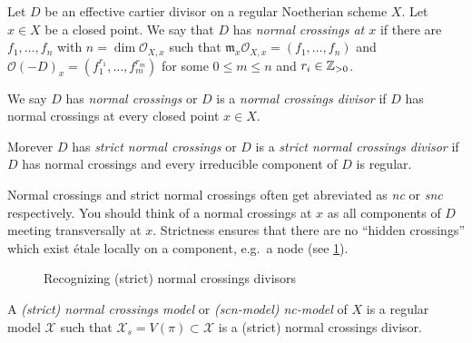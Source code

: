 \begin{definition}
	Let $D$ be an effective cartier divisor on a regular Noetherian scheme $X$. 	Let $x \in X$ be a closed point. 
	We say that $D$ has \emph{normal crossings at $x$ } if there are $f_1, \ldots, f_n$ with $n = \dim \mathcal{O}_{X, x}$ such that $\mathfrak{m} _x \mathcal{O}_{X, x} = (f_1, \ldots, f_n)$ and $\mathcal{O}(-D)_{x} = (f_1^{r_1}, \ldots, f_m^{r_m})$ for some $0 \le m \le n$ and $r_i \in \mathbb{Z}_{> 0}$. 

	We say $D$ has \emph{normal crossings} or $D$ is a \emph{normal crossings divisor} if $D$ has normal crossings at every closed point  $x \in X$. 

	Morever  $D$ has \emph{strict normal crossings} or $D$ is a \emph{strict normal crossings divisor} if $D$ has normal crossings and every irreducible component of $D$ is regular. 
\end{definition}
Normal crossings and strict normal crossings often get abreviated as \emph{nc} or \emph{snc} respectively.
You should think of a normal crossings at $x$ as all components of $D$ meeting transversally at $x$. 
Strictness ensures that there are no ``hidden crossings'' which exist étale locally on a component, e.g.\ a node (see \cref{fig:normal_crossings_divisors}).

\begin{figure}[ht]
    \centering
    \caption{Recognizing (strict) normal crossings divisors}
    \label{fig:normal_crossings_divisors}
\end{figure}
\begin{definition}
	A \emph{(strict) normal crossings model} or \emph{(scn-model) nc-model}  of $X$ is a regular model $\mathscr X$ such that $\mathscr X_s = V(\pi) \subset  \mathscr X$ is a (strict) normal crossings divisor. 
\end{definition}



